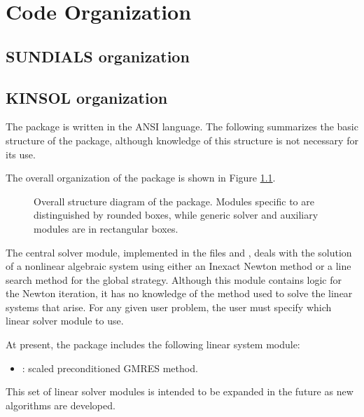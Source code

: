 \chapter{Code Organization}\label{s:organization}

\section{SUNDIALS organization}\label{ss:sun_org}


\section{KINSOL organization}\label{ss:cvode_org}

The {\kinsol} package is written in the ANSI {\C} language. The following
summarizes the basic structure of the package, although knowledge
of this structure is not necessary for its use.

The overall organization of the {\kinsol} package is shown in Figure
\ref{f:kinorg}. 
\begin{figure}
{\centerline{}}
\caption [Overall structure diagram of the {\kinsol} package]
{Overall structure diagram of the {\kinsol} package.
  Modules specific to {\kinsol} are distinguished by rounded boxes, while 
  generic solver and auxiliary modules are in rectangular boxes.}
\label{f:kinorg}
\end{figure}

The central solver module, implemented in the files 
 and , deals with the solution of a nonlinear
algebraic system using either an Inexact Newton method or a line search method
for the global strategy. Although this module contains logic for the Newton
iteration, it has no knowledge of the method used to solve the linear
systems that arise. For any given user problem, the user must specify
which linear solver module to use.

At present, the package includes the following {\kinsol} linear system
module:
\begin{itemize} 
\item {\kinspgmr}: scaled preconditioned GMRES method.
\end{itemize}
This set of linear solver modules is intended to be expanded in the
future as new algorithms are developed.

